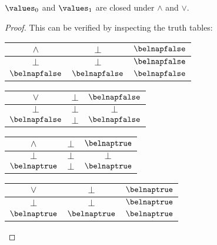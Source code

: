 \begin{lemma}
    \(\values_0\) and \(\values_1\) are closed under \(\land\) and \(\lor\).
\end{lemma}
\begin{proof}
    This can be verified by inspecting the truth tables:
    \begin{center}
        \begin{tabular}{|c|cc|}
            \hline
            \(\land\)        & \(\bot\)         & \(\belnapfalse\) \\
            \hline
            \(\bot\)         & \(\bot\)         & \(\belnapfalse\) \\
            \(\belnapfalse\) & \(\belnapfalse\) & \(\belnapfalse\) \\
            \hline
        \end{tabular}
        \quad
        \begin{tabular}{|c|cc|}
            \hline
            \(\lor\)         & \(\bot\) & \(\belnapfalse\) \\
            \hline
            \(\bot\)         & \(\bot\) & \(\bot\)         \\
            \(\belnapfalse\) & \(\bot\) & \(\belnapfalse\) \\
            \hline
        \end{tabular}
    \end{center}
    \begin{center}
        \begin{tabular}{|c|cc|}
            \hline
            \(\land\)       & \(\bot\) & \(\belnaptrue\) \\
            \hline
            \(\bot\)        & \(\bot\) & \(\bot\)        \\
            \(\belnaptrue\) & \(\bot\) & \(\belnaptrue\) \\
            \hline
        \end{tabular}
        \quad
        \begin{tabular}{|c|cc|}
            \hline
            \(\lor\)        & \(\bot\)        & \(\belnaptrue\) \\
            \hline
            \(\bot\)        & \(\bot\)        & \(\belnaptrue\) \\
            \(\belnaptrue\) & \(\belnaptrue\) & \(\belnaptrue\) \\
            \hline
        \end{tabular}
    \end{center}

    \qedhere
\end{proof}

